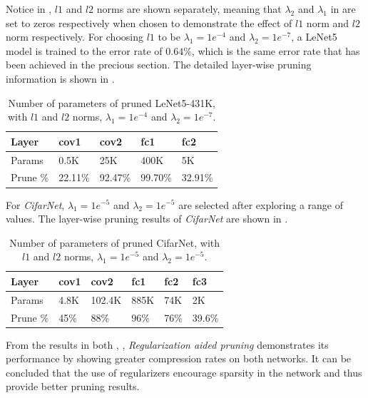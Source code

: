 \documentclass[a4paper,12pt]{report}
\begin{document}
Notice in , $l1$ and $l2$ norms are shown separately,
meaning that $\lambda_{2}$ and $\lambda_{1}$ in  are set to
zeros respectively when chosen to demonstrate the effect of $l1$ norm
and $l2$ norm respectively.
For choosing $l1$ to be $\lambda_1 = 1e^{-4}$ and $\lambda_2 = 1e^{-7}$, a LeNet5 model
is trained to the error rate of $0.64\%$, which is the same error rate that has
been achieved in the precious section.
The detailed layer-wise pruning information is shown in .

\begin{table}[!h]
\centering
\begin{tabular}{|l|l|l|l|l|}
\hline
Layer			&cov1	    &cov2	&fc1	&fc2 	\\	 \hline
Params		& 0.5K		&25K	&400K	&5K \\ \hline
Prune \%	& 22.11\%		&92.47\%	&99.70\%	&32.91\%	\\ \hline
\end{tabular}
\caption{Number of parameters of pruned LeNet5-431K, with $l1$ and $l2$ norms, $\lambda_1 = 1e^{-4}$ and $\lambda_2 = 1e^{-7}$.}
\label{tab:LeNetprunel1l2}
\end{table}

For \textit{CifarNet}, $\lambda_{1} = 1e^{-5}$ and $\lambda_{2} = 1e^{-5}$
are selected after exploring a range of values.
The layer-wise pruning results of \textit{CifarNet} are shown
in .
\begin{table}[!h]
\centering
\begin{tabular}{|l|l|l|l|l|l|}
\hline
Layer			&cov1	&cov2		&fc1		&fc2		&fc3		\\ \hline
Params		& 4.8K		&102.4K	&885K	&74K		&2K 	\\
\hline
Prune \%	& 45\%		&88\%	&96\%	&76\%	&39.6\% \\
\hline
\end{tabular}
\caption{Number of parameters of pruned CifarNet, with $l1$ and $l2$ norms,
$\lambda_1 = 1e^{-5}$ and $\lambda_2 = 1e^{-5}$.}
\label{tab:CifarNetPrunel1l2}
\end{table}

From the results in both , ,
\textit{Regularization aided pruning} demonstrates its performance by showing
greater compression rates on both networks.
It can be concluded that the use of regularizers encourage sparsity in the
network and thus provide better pruning results.
\end{document}
